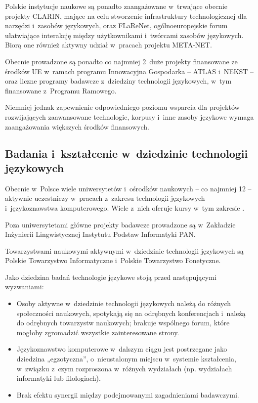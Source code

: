 \begin{multicols}{2}
Polskie instytucje naukowe są ponadto zaangażowane w~trwające
obecnie projekty CLARIN, mające na celu stworzenie infrastruktury
technologicznej dla narzędzi i~zasobów językowych, oraz FLaReNet,
ogólnoeuropejskie forum ułatwiające interakcję między
użytkownikami i~twórcami zasobów językowych. Biorą one również
aktywny udział w~pracach projektu META-NET. 

Obecnie prowadzone są ponadto co najmniej 2~duże projekty
finansowane ze środków UE w~ramach programu Innowacyjna Gospodarka
– ATLAS i~NEKST – oraz liczne programy badawcze z~dziedziny
technologii językowych, w~tym finansowane z~Programu Ramowego. 

Niemniej jednak zapewnienie odpowiedniego poziomu wsparcia dla
projektów rozwijających zaawansowane technologie, korpusy i~inne
zasoby językowe wymaga zaangażowania większych środków
finansowych. 

\subsection[Badania i~kształcenie w~dziedzinie technologii
językowych]{Badania i~kształcenie w~dziedzinie technologii
językowych} 

Obecnie w~Polsce wiele uniwersytetów i~ośrodków naukowych -- co
najmniej 12 -- aktywnie uczestniczy w~pracach z~zakresu technologii
językowych i~językoznawstwa komputerowego. Wiele z~nich oferuje
kursy w~tym zakresie \cite{centers1}. 

Poza uniwersytetami główne projekty badawcze prowadzone są
w~Zakładzie Inżynierii Lingwistycznej Instytutu Podstaw Informatyki
PAN. 

Towarzystwami naukowymi aktywnymi w~dziedzinie technologii językowych
są Polskie Towarzystwo Informatyczne i~Polskie Towarzystwo
Fonetyczne. 

Jako dziedzina badań technologie językowe stoją przed
następującymi wyzwaniami: 

\begin{itemize} \item Osoby aktywne w~dziedzinie technologii
językowych należą do różnych społeczności naukowych, spotykają
się na odrębnych konferencjach i~należą do odrębnych towarzystw
naukowych; brakuje wspólnego forum, które mogłoby zgromadzić
wszystkie zainteresowane strony. \item Językoznawstwo komputerowe
w~dalszym ciągu jest postrzegane jako dziedzina „egzotyczna”,
o~nieustalonym miejscu w~systemie kształcenia, w~związku z~czym
rozproszona w~różnych wydziałach (np. wydziałach informatyki lub
filologiach). \item Brak efektu synergii między podejmowanymi
zagadnieniami badawczymi. \end{itemize} 


\end{multicols}
